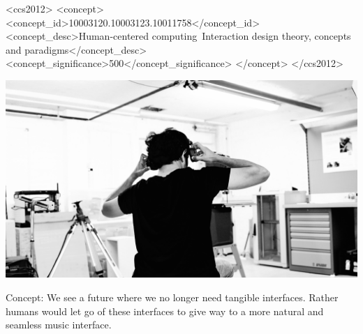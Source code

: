 \documentclass[sigchi]{acmart}
\begin{document}
\begin{CCSXML}
<ccs2012>
   <concept>
       <concept_id>10003120.10003123.10011758</concept_id>
       <concept_desc>Human-centered computing~Interaction design theory, concepts and paradigms</concept_desc>
       <concept_significance>500</concept_significance>
       </concept>
 </ccs2012>
\end{CCSXML}


\begin{teaserfigure}
  \includegraphics[width=\textwidth]{acmart-master-2/samples/test2bw.png}
  \caption{Concept: We see a future where we no longer need tangible interfaces. Rather humans would let go of these interfaces to give way to a more natural and seamless music interface.}
  \label{fig:teaser}
\end{teaserfigure}
\maketitle
\end{document}
